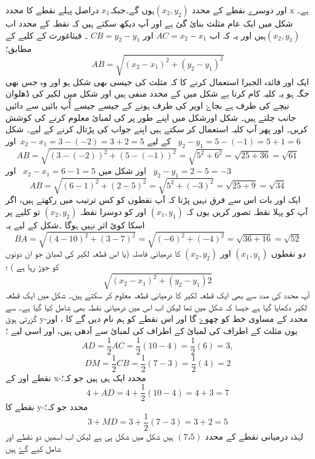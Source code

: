 اور دوسرے نقطے کے محدد  \((x_{2},y_{2})\)ہوں گے۔جبکہ\( x_{1} \) دراصل پہلے نقطے کا  محدد x  ہے۔
شکل  میں ایک عام مثلث بنائ گئ ہے اور آپ دیکھ سکتے ہیں کہ   نقطہ    کے محدد اب  \((x_{2},y_{1})\)ہیں اور یہ کہ اب \(AC = x_2 - x_1 \) اور \(CB=y_2 -y_1 \) ۔
فیثاغورث کے کلیے کے مطابق؛
\[ AB = \sqrt{(x_2 - x_1)^2 + (y_2 - y_1 )^2} \]
ایک اور فائدہ الجبرا استعمال کرنے کا کہ مثلث کی جیسی بھی شکل ہو اور وہ جس بھی جگہ ہو یہ کلیہ کام کرتا ہے  شکل  میں  کے  محدد منفی ہیں اور شکل   میں لکیر کی ڈھلوان نیچے کی طرف ہے بجاۓ اوپر کی طرف ہونے کے جیسے جیسے آُپ بائیں سے دائیں جانب چلتے ہیں۔ شکل  اورشکل  میں اپنے طور پر   کی لمبائ معلوم کرنے کی کوشش کریں۔ اور پھر آپ کلیہ استعمال کر سکتے ہیں اپنے جواب کی پڑتال کرنے کے لیے۔
شکل  کے لیے
\( x_2 - x_1 = 3-(-2) = 3+2 = 5\)\, اور \, \(y_2 - y_1 = 5-(-1) = 5+1 = 6\)
\[ AB = \sqrt{(3-(-2))^2 +(5-(-1))^2}= \sqrt{5^2 + 6^2} = \sqrt{25+36} =\sqrt{61}\]
اور  شکل   میں 
\( x_2 - x_1 = 6-1 = 5\) \, اور \, \(y_2 -y_1 = 2-5 = -3\)
 \[ AB = \sqrt{(6-1)^2 + (2-5)^2 }= \sqrt{5^2 + (-3)^2} = \sqrt{25 + 9} = \sqrt{34}\]
ایک اور بات اس سے فرق نہیں پڑتا کہ آپ نقطوں کو کس ترتیب میں رکھتے ہیں، اگر آپ  کو پہلا نقطہ تصور کریں یوں کہ   \((x_{1},y_{1})\)  اور   کو  دوسرا نقطہ      \((x_{2},y_{2})\)  تو کلیے پر اسکا کوئ اثر نہیں ہوگا ۔شکل کے لیے یہ 
\[ BA = \sqrt{(4-10)^2 + (3-7)^2} = \sqrt{(-6)^2 + (-4)^2 } = \sqrt{36+16} = \sqrt{52}\]
دو نقطوں  \((x_{1},y_{1})\) اور  \((x_{2},y_{2})\) کا درمیانی فاصلہ (یا اس قطعہ لکیر کی لمبائ جو ان دونوں کو جوڑ رہا ہے ) ؛
\[ \sqrt{(x_2-x_1)^2 + (y_2 - y_1)2}\]
آپ محدد کی مدد سے بھی ایک قطعہ لکیر کا درمیانی قطعہ معلوم کر سکتے ہیں۔
شکل میں ایک قطعہ لکیر دکھایا گیا ہے جیسا کہ شکل  میں تھا لیکن اب اس میں درمیانی نقطہ    بھی شامل کیا گیا ہے۔   سے گزرتی ہوئ   y-محدد کے مساوی خط     کو چھوۓ گا اور اس نقطے کو ہم نام دیں گے    کا ، اور یوں مثلث   کے اطراف کی لمبائ    کے اطراف کی لمبائ سے   آدھی ہیں، اور اسی لیے ؛   \[ AD = \frac{1}{2} AC = \frac{1}{2} (10-4) = \frac{1}{2} (6)= 3,\]
\[ DM = \frac{1}{2} CB= \frac{1}{2} (7-3) = \frac{1}{2} (4)=2\]
نقطے   اور   کے x-محدد ایک ہی ہیں جو کہ؛
\[ 4+AD=4+ \frac{1}{2} (10-4) = 4+3 =7\] 
نقطے    کا y-محدد جو کہ؛
\[ 3+MD = 3+ \frac{1}{2} (7-3) = 3+2 = 5\]
لہٰذہ درمیانی  نقطے     کے محدد    \( (7،5 )  \) ہیں 
شکل  میں شکل  ہی ہے لیکن اب اسمیں دو نقطے   اور   شامل کیے گۓ ہیں 
